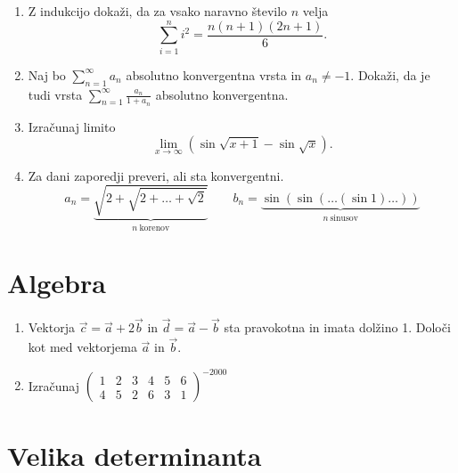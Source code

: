 \documentclass[a4paper,12pt]{article}
\begin{document}
\begin{enumerate}
\item
Z indukcijo dokaži, da za vsako naravno število \(n\) velja
\[\sum_{i=1}^n i^2 = \frac{n(n+1)(2n+1)}{6}.\]

\item
Naj bo \(\sum_{n=1}^\infty a_n\) absolutno konvergentna vrsta in \(a_n \ne -1\).
Dokaži, da je tudi vrsta \(\sum_{n=1}^\infty \frac{a_n}{1+a_n}\)
absolutno konvergentna.

\item
Izračunaj limito
\[\lim_{x\to\infty} (\sin\sqrt{x+1} - \sin\sqrt{x}).\]

\item
Za dani zaporedji preveri, ali sta konvergentni.
\[a_n = \underbrace{\sqrt{2+\sqrt{2+\dots+\sqrt{2}}}}_{n~\text{korenov}} \qquad 
b_n = \underbrace{\sin(\sin(\dots(\sin 1)\dots))}_{n~\text{sinusov}}\]
\end{enumerate}

\section*{Algebra}

\begin{enumerate}
\item
Vektorja \(\vec{c} = \vec{a} + 2\vec{b}\) in \(\vec{d} = \vec{a} - \vec{b}\)
sta pravokotna in imata dolžino 1. Določi kot med vektorjema \(\vec{a}\) in \(\vec{b}\).

\item
Izračunaj
\(\begin{pmatrix}
1 & 2 & 3 & 4 & 5 & 6 \\
4 & 5 & 2 & 6 & 3 & 1
\end{pmatrix}^{-2000}\)
\end{enumerate}

\section*{Velika determinanta}
\end{document}
